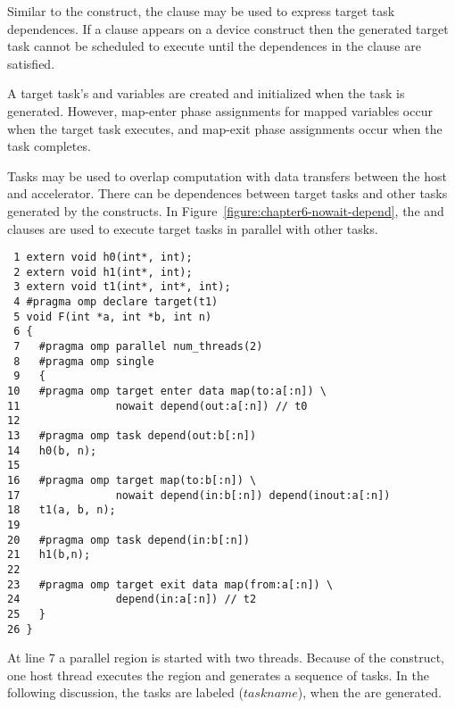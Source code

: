 Similar to the  construct, the  clause may be
used to express target task dependences.  If a  clause appears on
a device construct then the generated target task cannot be scheduled to
execute until the dependences in the clause are satisfied.

A target task's  and  variables are created and initialized
when the task is generated.  However, map-enter phase assignments for mapped
variables occur when the target task executes, and map-exit phase assignments
occur when the task completes. 

Tasks may be used to overlap computation with data transfers between the host
and accelerator.  There can be dependences between target tasks and other tasks
generated by the  constructs.  In
Figure~\ref{figure:chapter6-nowait-depend}, the  and
 clauses are used to execute target tasks in parallel with other tasks.

\begin{figure*}[!tb]
\begin{verbatim}
 1 extern void h0(int*, int);
 2 extern void h1(int*, int);
 3 extern void t1(int*, int*, int);
 4 #pragma omp declare target(t1)
 5 void F(int *a, int *b, int n)
 6 {
 7   #pragma omp parallel num_threads(2)
 8   #pragma omp single
 9   {
10   #pragma omp target enter data map(to:a[:n]) \
11               nowait depend(out:a[:n]) // t0
12 
13   #pragma omp task depend(out:b[:n])
14   h0(b, n);
15 
16   #pragma omp target map(to:b[:n]) \
17               nowait depend(in:b[:n]) depend(inout:a[:n])
18   t1(a, b, n);
19 
20   #pragma omp task depend(in:b[:n])
21   h1(b,n);
22 
23   #pragma omp target exit data map(from:a[:n]) \
24               depend(in:a[:n]) // t2
25   }
26 }
\end{verbatim}
\caption{ \textbf {Example using the nowait and depend clauses } -- \small
          Use the \texttt{depend} and \texttt{nowait} clauses to execute target
          tasks in parallel with other host tasks.
         }
\label{figure:chapter6-nowait-depend}
\end{figure*}

At line $7$ a parallel region is started with two threads.  Because of the
 construct, one host thread executes the region and generates a
sequence of tasks.  
In the following discussion, the tasks are labeled ($task name$), when
the are generated.

